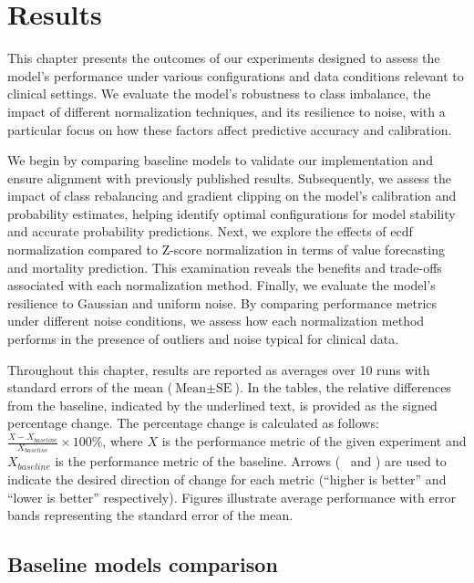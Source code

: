 
\chapter{Results}
\label{ch:results}

This chapter presents the outcomes of our experiments designed to assess the model's performance under various configurations and data conditions relevant to clinical settings. We evaluate the model's robustness to class imbalance, the impact of different normalization techniques, and its resilience to noise, with a particular focus on how these factors affect predictive accuracy and calibration.

We begin by comparing baseline models to validate our implementation and ensure alignment with previously published results. Subsequently, we assess the impact of class rebalancing and gradient clipping on the model's calibration and probability estimates, helping identify optimal configurations for model stability and accurate probability predictions. Next, we explore the effects of \gls{ecdf} normalization compared to Z-score normalization in terms of value forecasting and mortality prediction. This examination reveals the benefits and trade-offs associated with each normalization method. Finally, we evaluate the model's resilience to Gaussian and uniform noise. By comparing performance metrics under different noise conditions, we assess how each normalization method performs in the presence of outliers and noise typical for clinical data.

Throughout this chapter, results are reported as averages over 10 runs with standard errors of the mean (\( \text{Mean} \pm \text{SE} \)). In the tables, the relative differences from the baseline, indicated by the underlined text, is provided as the signed percentage change. The percentage change is calculated as follows: $\frac{X - X_{baseline}}{X_{baseline}} \times 100\%$, where $X$ is the performance metric of the given experiment and $X_{baseline}$ is the performance metric of the baseline. Arrows (\textuparrow~ and \textdownarrow) are used to indicate the desired direction of change for each metric (``higher is better'' and ``lower is better'' respectively). Figures illustrate average performance with error bands representing the standard error of the mean.


\section{Baseline models comparison}
\label{sec:baseline_models_comparison}

